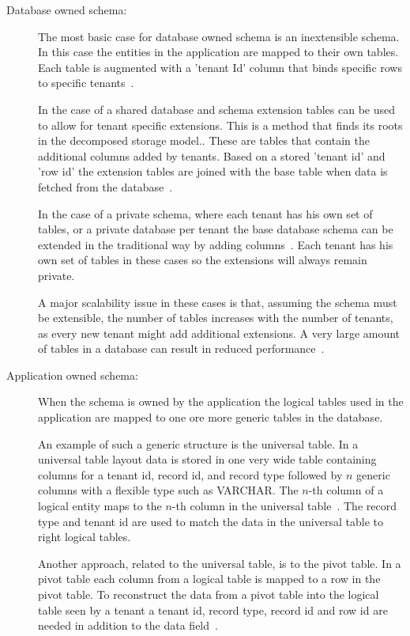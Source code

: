 \begin{description}
	\item[Database owned schema: ] The most basic case for database owned schema is an inextensible schema.
		In this case the entities in the application are mapped to their own tables.
		Each table is augmented with a 'tenant Id' column that binds specific rows to specific tenants~\cite{aulbach2008multi}.

		In the case of a shared database and schema extension tables can be used to allow for tenant specific extensions.
		This is a method that finds its roots in the decomposed storage model.\cite{copeland1985decomposition}.
		These are tables that contain the additional columns added by tenants. 
		Based on a stored 'tenant id' and 'row id' the extension tables are joined with the base table when data is fetched from the database~\cite{aulbach2008multi}.

		In the case of a private schema, where each tenant has his own set of tables, or a private database per tenant the base database schema can be extended in the traditional way by adding columns~\cite{aulbach2009comparison}.
		Each tenant has his own set of tables in these cases so the extensions will always remain private. 
	
		A major scalability issue in these cases is that, assuming the schema must be extensible, the number of tables increases with the number of tenants, as every new tenant might add additional extensions.
		A very large amount of tables in a database can result in reduced performance~\cite{aulbach2008multi}.
	\item[Application owned schema: ] When the schema is owned by the application the logical tables used in the application are mapped to one ore more generic tables in the database.
		
		An example of such a generic structure is the universal table. 
		In a universal table layout data is stored in one very wide table containing columns for a tenant id, record id, and record type followed by $n$ generic columns with a flexible type such as VARCHAR.
		The $n$-th column of a logical entity maps to the $n$-th column in the universal table~\cite{aulbach2008multi}. The record type and tenant id are used to match the data in the universal table to right logical tables.

		Another approach, related to the universal table, is to the pivot table. 
		In a pivot table each column from a logical table is mapped to a row in the pivot table.
		To reconstruct the data from a pivot table into the logical table seen by a tenant a tenant id, record type, record id and row id are needed in addition to the data field~\cite{aulbach2008multi}.


\end{description}
